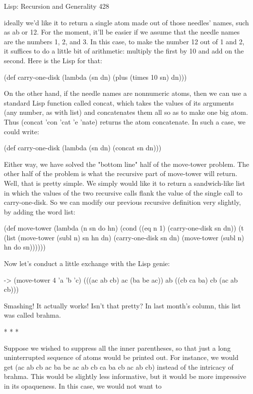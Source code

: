Lisp: Recursion and Generality                                                         428

ideally we'd like it to return a single atom made out of those needles' names, such as
ab or 12. For the moment, it'll be easier if we assume that the needle names are the
numbers 1, 2, and 3. In this case, to make the number 12 out of 1 and 2, it suffices to
do a little bit of arithmetic: multiply the first by 10 and add on the second. Here is the
Lisp for that:

(def carry-one-disk (lambda (sn dn) (plus (times 10 sn) dn)))

On the other hand, if the needle names are nonnumeric atoms, then we can use a
standard Lisp function called concat, which takes the values of its arguments (any
number, as with list) and concatenates them all so as to make one big atom. Thus
(concat 'con 'cat 'e 'nate) returns the atom concatenate. In such a case, we could
write:

(def carry-one-disk (lambda (sn dn) (concat sn dn)))

Either way, we have solved the "bottom line" half of the move-tower problem.
        The other half of the problem is what the recursive part of move-tower will
return. Well, that is pretty simple. We simply would like it to return a sandwich-like
list in which the values of the two recursive calls flank the value of the single call to
carry-one-disk. So we can modify our previous recursive definition very slightly, by
adding the word list:

(def move-tower (lambda (n sn do hn)
      (cond ((eq n 1) (carry-one-disk sn dn))
             (t (list (move-tower (subl n) sn hn dn)
                       (carry-one-disk sn dn)
                       (move-tower (subl n) hn do sn))))))

Now let's conduct a little exchange with the Lisp genie:

-> (move-tower 4 'a 'b 'c)
(((ac ab cb) ac (ba be ac)) ab ((cb ca ba) cb (ac ab cb)))

Smashing! It actually works! Isn't that pretty? In last month's column, this list was
called brahma.

                                        *   *   *

Suppose we wished to suppress all the inner parentheses, so that just a long
uninterrupted sequence of atoms would be printed out. For instance, we would get (ac
ab cb ac ba be ac ab cb ca ba cb ac ab cb) instead of the intricacy of brahma. This
would be slightly less informative, but it would be more impressive in its opaqueness.
In this case, we would not want to




